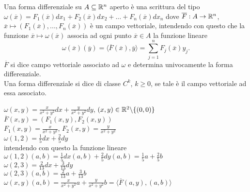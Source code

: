 \begin{definition}
	Una forma differenziale su $A \subseteq \mathbb{R}^n$ aperto è una scrittura del tipo 
	$\omega (\overline{x})=F_1(\overline{x})dx_1 +F_2(\overline{x})dx_2 +...+ F_n(\overline{x})dx_n$ dove $\overline{F}: A \rightarrow \mathbb{R}^n$, $\overline{x} \mapsto (F_1(\overline{x}),...,F_n(\overline{x}))$ è un campo vettoriale, intendendo con questo che la funzione $\overline{x}\mapsto \omega (\overline{x})$ associa ad ogni punto $\overline{x} \in A$ la funzione lineare
	\begin{equation*}
		\omega(\overline{x})(\overline{y}) =\langle \overline{F}(\overline{x}),\overline{y}\rangle =\sum_{j=1}^n F_j (\overline{x}) y_j.
	\end{equation*}
	$\overline{F}$ si dice campo vettoriale associato ad $\omega$ e determina univocamente la forma differenziale.\\
	Una forma differenziale si dice di classe $C^k$, $k \geq 0$, se tale è il campo vettoriale ad essa associato.
\end{definition}


\begin{exbar}
\begin{example}
	$\omega(x,y) =\frac{x}{x^2+y^2}dx+\frac{y}{x^2+y^2}dy$, $(x,y)\in \mathbb{R}^2\backslash \{(0,0)\}$\\
	$\overline{F}(x,y)=(F_1(x,y),F_2(x,y))$\\
	$F_1(x,y)=\frac{x}{x^2+y^2}$, $F_2(x,y)=\frac{y}{x^2+y^2}$\\
	$\omega(1,2)=\frac{1}{5}dx+\frac{2}{5}dy$\\
	intendendo con questo la funzione lineare
	$ \omega (1,2)(a,b)=\frac{1}{5}dx (a,b) + \frac{2}{5}dy (a,b) =\frac{1}{5}a + \frac{2}{5} b$\\
	$\omega(2,3)=\frac{2}{13}dx+\frac{3}{13}dy$\\
	$\omega(2,3)(a,b)=\frac{2}{13}a+\frac{3}{13}b$\\
	$\omega(x,y)(a,b)=\frac{x}{x^2+y^2}a+ \frac{y}{x^2+y^2}b= \langle \overline{F}(a,y),(a,b) \rangle$
\end{example}
\end{exbar}



